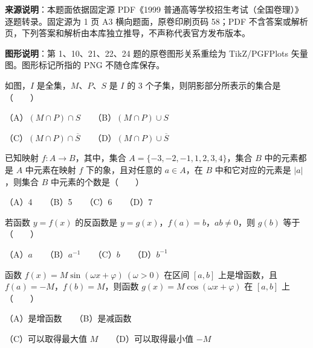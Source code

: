 


\begin{gktip}
\textbf{来源说明}：本题面依据固定源 PDF《1999 普通高等学校招生考试（全国卷理）》逐题转录。固定源为 1 页 A3 横向题面，原卷印刷页码 58；PDF 不含答案或解析页，下列答案和解析由本库独立推导，不声称代表官方发布版本。

\textbf{图形说明}：第 1、10、21、22、24 题的原卷图形关系重绘为 TikZ/PGFPlots 矢量图。图形标记所指的 PNG 不随仓库保存。
\end{gktip}

\Needspace{0.4\textheight}
\begin{question}
如图，$I$ 是全集，$M$、$P$、$S$ 是 $I$ 的 3 个子集，则阴影部分所表示的集合是\mbox{（　　）}
\nopagebreak[4]
\begin{center}\end{center}
\nopagebreak[4]
（A）$(M\cap P)\cap S$　　（B）$(M\cap P)\cup S$

（C）$(M\cap P)\cap\overline S$　　（D）$(M\cap P)\cup\overline S$

\end{question}
\begin{question}
已知映射 $f:A\to B$，其中，集合 $A=\{-3,-2,-1,1,2,3,4\}$，集合 $B$ 中的元素都是 $A$ 中元素在映射 $f$ 下的象，且对任意的 $a\in A$，在 $B$ 中和它对应的元素是 $|a|$，则集合 $B$ 中元素的个数是\mbox{（　　）}

（A）4　　（B）5　　（C）6　　（D）7

\end{question}
\begin{question}
若函数 $y=f(x)$ 的反函数是 $y=g(x)$，$f(a)=b$，$ab\ne0$，则 $g(b)$ 等于\mbox{（　　）}

（A）$a$　　（B）$a^{-1}$　　（C）$b$　　（D）$b^{-1}$

\end{question}
\begin{question}
函数 $f(x)=M\sin(\omega x+\varphi)\ (\omega>0)$ 在区间 $[a,b]$ 上是增函数，且 $f(a)=-M$，$f(b)=M$，则函数 $g(x)=M\cos(\omega x+\varphi)$ 在 $[a,b]$ 上\mbox{（　　）}

（A）是增函数　　（B）是减函数

（C）可以取得最大值 $M$　　（D）可以取得最小值 $-M$

\end{question}
